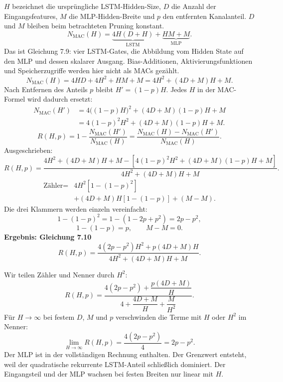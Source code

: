 $H$ bezeichnet die ursprüngliche LSTM-Hidden-Size, $D$ die Anzahl der Eingangsfeatures, $M$ die MLP-Hidden-Breite und $p$ den entfernten Kanalanteil. $D$ und $M$ bleiben beim betrachteten Pruning konstant.
\[
N_{\mathrm{MAC}}(H)=\underbrace{4H(D+H)}_{\text{LSTM}}+
\underbrace{HM+M}_{\text{MLP}}.
\]
Das ist Gleichung 7.9: vier LSTM-Gates, die Abbildung vom Hidden State auf den MLP und dessen skalarer Ausgang. Bias-Additionen, Aktivierungsfunktionen und Speicherzugriffe werden hier nicht als MACs gezählt.
\[
N_{\mathrm{MAC}}(H)=4HD+4H^2+HM+M
=\boxed{4H^2+(4D+M)H+M}.
\]
Nach Entfernen des Anteils $p$ bleibt $H'=(1-p)H$. Jedes $H$ in der MAC-Formel wird dadurch ersetzt:
\[
\begin{aligned}
N_{\mathrm{MAC}}(H')
&=4\bigl((1-p)H\bigr)^2+(4D+M)(1-p)H+M\\
&=4(1-p)^2H^2+(4D+M)(1-p)H+M.
\end{aligned}
\]
\[
R(H,p)=1-\frac{N_{\mathrm{MAC}}(H')}{N_{\mathrm{MAC}}(H)}
=\frac{N_{\mathrm{MAC}}(H)-N_{\mathrm{MAC}}(H')}{N_{\mathrm{MAC}}(H)}.
\]
Ausgeschrieben:
\[
R(H,p)=\frac{4H^2+(4D+M)H+M-\left[4(1-p)^2H^2+(4D+M)(1-p)H+M\right]}
{4H^2+(4D+M)H+M}.
\]
\[
\begin{aligned}
\text{Zähler}={}&4H^2\left[1-(1-p)^2\right]\\
&+(4D+M)H\left[1-(1-p)\right]+(M-M).
\end{aligned}
\]
Die drei Klammern werden einzeln vereinfacht:
\[
1-(1-p)^2=1-(1-2p+p^2)=2p-p^2,
\]
\[
1-(1-p)=p,\qquad M-M=0.
\]
\textbf{Ergebnis: Gleichung 7.10}
\[
\boxed{R(H,p)=\frac{4(2p-p^2)H^2+p(4D+M)H}{4H^2+(4D+M)H+M}.}
\]

Wir teilen Zähler und Nenner durch $H^2$:
\[
R(H,p)=\frac{4(2p-p^2)+\dfrac{p(4D+M)}{H}}
{4+\dfrac{4D+M}{H}+\dfrac{M}{H^2}}.
\]
Für $H\to\infty$ bei festem $D$, $M$ und $p$ verschwinden die Terme mit $H$ oder $H^2$ im Nenner:
\[
\lim_{H\to\infty}R(H,p)=\frac{4(2p-p^2)}4=\boxed{2p-p^2}.
\]
Der MLP ist in der vollständigen Rechnung enthalten. Der Grenzwert entsteht, weil der quadratische rekurrente LSTM-Anteil schließlich dominiert. Der Eingangsteil und der MLP wachsen bei festen Breiten nur linear mit $H$.

